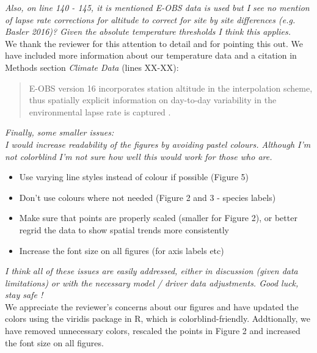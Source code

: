 \documentclass[11pt,a4paper]{article}\usepackage[]{graphicx}\usepackage[]{color}
\begin{document}
\textit{Also, on line 140 - 145, it is mentioned E-OBS data is used but I see no mention of lapse rate corrections for altitude to correct for site by site differences (e.g. Basler 2016)? Given the absolute temperature thresholds I think this applies.} \\

We thank the reviewer for this attention to detail and for pointing this out. We have included more information about our temperature data and a citation in Methods section \textit{Climate Data} (lines XX-XX): \\

\begin{quotation}
\noindent  E-OBS version 16 incorporates station altitude in the interpolation scheme, thus spatially explicit information on day-to-day variability in the environmental lapse rate is captured \citep{Cornes2018}.
\end{quotation}


\textit{Finally, some smaller issues: }\\

\textit{I would increase readability of the figures by avoiding pastel colours. Although I'm not colorblind I'm not sure how well this would work for those who are. }\\

\begin{itemize}
\item Use varying line styles instead of colour if possible (Figure 5)
\item  Don't use colours where not needed (Figure 2 and 3 - species labels)
\item  Make sure that points are properly scaled (smaller for Figure 2), or better regrid the data to show spatial trends more consistently
\item Increase the font size on all figures (for axis labels etc)
\end{itemize}

\textit{I think all of these issues are easily addressed, either in discussion (given data limitations) or with the necessary model / driver data adjustments. Good luck, stay safe !} \\

We appreciate the reviewer's concerns about our figures and have updated the colors using the viridis package in R, which is colorblind-friendly. Addtionally, we have removed unnecessary colors, rescaled the points in Figure 2 and increased the font size on all figures.

\newpage

\end{document}
